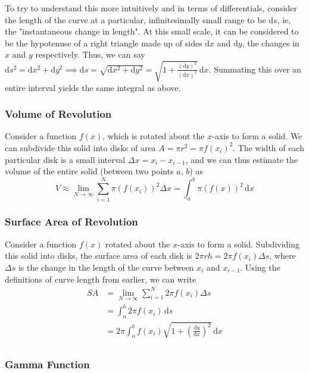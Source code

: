 \documentclass[12pt]{article}
\begin{document}
To try to understand this more intuitively and in terms of differentials, consider the length of the curve at a particular, infinitesimally small range to be $\text{d}s$, ie, the "instantaneous change in length". At this small scale, it can be considered to be the hypotenuse of a right triangle made up of sides $\text{d}x$ and $\text{d}y$, the changes in $x$ and $y$ respectively. Thus, we can say $\text{d}s^2 = \text{d}x^2 + \text{d}y^2 \implies \text{d}s = \sqrt{\text{d}x^2 + \text{d}y^2} = \sqrt{1 + \frac{(\text{d}y)^2}{(\text{d}x)^2}}\,\text{d}x$. Summating this over an entire interval yields the same integral as above.

\subsubsection{Volume of Revolution}
Consider a function $f(x)$, which is rotated about the $x$-axis to form a solid. We can subdivide this solid into disks of area $A = \pi r^2 = \pi f(x_i)^2$. The width of each particular disk is a small interval $\Delta x = x_i - x_{i - 1}$, and we can thus estimate the volume of the entire solid (between two points $a$, $b$) as \[V \approx \lim_{N \to \infty} \sum_{i = 1}^{N} \pi (f(x_i))^2 \Delta x = \int_a^b \pi (f(x))^2 \,\text{d}x\]

\subsubsection{Surface Area of Revolution}
Consider a function $f(x)$ rotated about the $x$-axis to form a solid. Subdividing this solid into disks, the surface area of each disk is $2 \pi r h = 2\pi f(x_i) \Delta s$, where $\Delta s$ is the change in the length of the curve between $x_i$ and $x_{i-1}$. Using the definitions of curve length from earlier, we can write \begin{align*}
    SA &= \lim_{N \to \infty} \sum_{i =1}^N 2 \pi f(x_i) \Delta s \\
    &= \int_a^b 2 \pi f(x_i) \,\text{d}s \\
    &= 2 \pi \int_a^b f(x_i) \sqrt{1 + (\frac{\text{d}y}{\text{d}x})^2} \,\text{d}x\\
\end{align*}

\subsubsection{Gamma Function}
\end{document}
